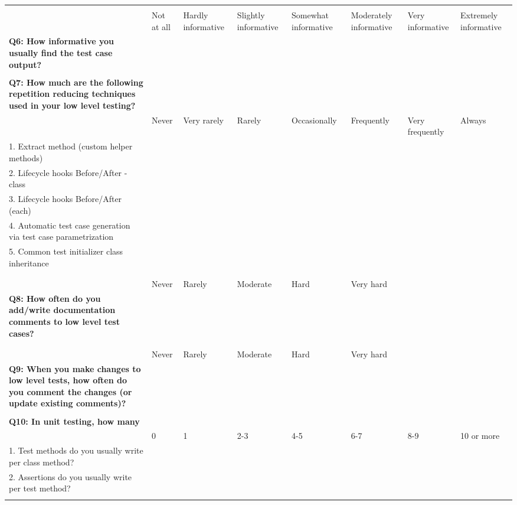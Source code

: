 \begin{table}
{\begin{tabular}{p{20.0cm}*{7}{p{2.0cm}}}
            & & & & & & \\
            & Not at all & Hardly informative & Slightly informative & Somewhat informative & Moderately informative & Very informative & Extremely informative \\
            \textbf{Q6: How informative you usually find the test case output?} & \\
            & \\ \hline

            \textbf{Q7: How much are the following repetition reducing techniques used in your low level testing?} & & & & & & \\
            & Never & Very rarely & Rarely & Occasionally & Frequently & Very \newline frequently & Always \\
            1. Extract method (custom helper methods) & \\
            2. Lifecycle hooks Before/After -class & \\
            3. Lifecycle hooks Before/After (each) & \\
            4. Automatic test case generation via test case parametrization & \\
            5. Common test initializer class inheritance & \\
            & \\ \hline

            & & & & & & \\
            & Never & Rarely & Moderate & Hard & Very hard & & \\
            \textbf{Q8: How often do you add/write documentation comments to low level test cases?} & \\
            & \\ \hline

            & & & & & & \\
            & Never & Rarely & Moderate & Hard & Very hard & & \\
            \textbf{Q9: When you make changes to low level tests, how often do you comment the changes (or update existing comments)?} & \\
            & \\ \hline

            \textbf{Q10: In unit testing, how many} & & & & & & \\
            & 0 & 1 & 2-3 & 4-5 & 6-7 &  8-9 & 10 or more \\
            1. Test methods do you usually write per class method? & \\
            2. Assertions do you usually write per test method? & \\
            & \\ \hline


\end{tabular}}
\end{table}
